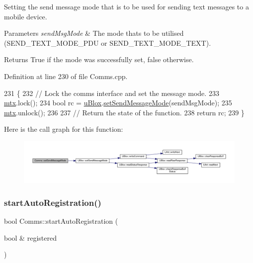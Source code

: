 Setting the send message mode that is to be used for sending text messages to a mobile device.


\begin{DoxyParams}{Parameters}
{\em send\+Msg\+Mode} & The mode that\textquotesingle{}s to be utilised (S\+E\+N\+D\+\_\+\+T\+E\+X\+T\+\_\+\+M\+O\+D\+E\+\_\+\+P\+DU or S\+E\+N\+D\+\_\+\+T\+E\+X\+T\+\_\+\+M\+O\+D\+E\+\_\+\+T\+E\+XT). \\
\hline
\end{DoxyParams}
\begin{DoxyReturn}{Returns}
True if the mode was successfully set, false otherwise. 
\end{DoxyReturn}


Definition at line 230 of file Comms.\+cpp.


\begin{DoxyCode}
231 \{
232     \textcolor{comment}{// Lock the comms interface and set the message mode.}
233     \hyperlink{class_comms_a21df861b1202573e4cd0cb5666d638fe}{mtx}.lock();
234     \textcolor{keywordtype}{bool} rc = \hyperlink{class_comms_ac64dea134b116147e5441172346dbd6c}{uBlox}.\hyperlink{class_u_blox_a12c1042d3bcb503b025927fd53d54243}{setSendMessageMode}(sendMsgMode);
235     \hyperlink{class_comms_a21df861b1202573e4cd0cb5666d638fe}{mtx}.unlock();
236 
237     \textcolor{comment}{// Return the state of the function.}
238     \textcolor{keywordflow}{return} rc;
239 \}
\end{DoxyCode}
Here is the call graph for this function\+:
\nopagebreak
\begin{figure}[H]
\begin{center}
\leavevmode
\includegraphics[width=350pt]{d8/dcc/class_comms_a1b6f5cafba74fc0e175f057e15656362_cgraph}
\end{center}
\end{figure}
\mbox{\label{class_comms_a9563254514d2f64c0427be2aeaba26d8}} 
\subsubsection{\texorpdfstring{start\+Auto\+Registration()}{startAutoRegistration()}}
{\footnotesize\ttfamily bool Comms\+::start\+Auto\+Registration (\begin{DoxyParamCaption}\item[{bool \&}]{registered }\end{DoxyParamCaption})}


